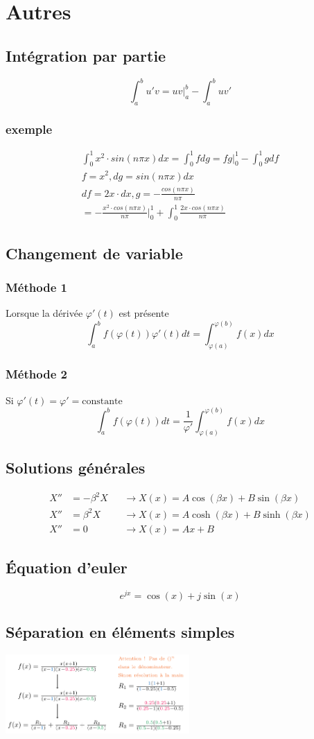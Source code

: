 \documentclass[resume]{subfiles}
\begin{document}
\section{Autres}
\label{sec_autres}
\subsection{Intégration par partie}
$$\int_{a}^{b}u'v=uv\Big|_{a}^{b}-\int_{a}^{b}uv'$$
\subsubsection{exemple}
\begin{align*}
\int_{0}^{1}x^2\cdot sin(n\pi x)dx=\int_{0}^{1} f dg = fg\Big|_{0}^{1} - \int_{0}^{1} g df \\
f=x^2, dg= sin(n\pi x)dx\\
df=2x\cdot dx, g = -\frac{cos(n\pi x)}{n\pi}\\
= -\frac{x^2\cdot cos(n\pi x)}{n\pi}\Big|_{0}^{1}+\int_{0}^{1} \frac{2x\cdot cos(n\pi x)}{n\pi}
\end{align*}

\subsection{Changement de variable}
\subsubsection{Méthode 1}
Lorsque la dérivée $\varphi'(t)$ est présente 
$$\int_{a}^{b}f(\varphi(t))\varphi'(t)dt=\int_{\varphi(a)}^{\varphi(b)}f(x)dx$$
\subsubsection{Méthode 2}
Si $\varphi'(t)=\varphi'=\text{constante}$
$$\int_{a}^{b}f(\varphi(t))dt=\frac{1}{\varphi'}\int_{\varphi(a)}^{\varphi(b)}f(x)dx$$
\subsection{Solutions générales}
\begin{align*}
X''&=-\beta^2 X&&\longrightarrow X(x)=A\cos(\beta x)+B\sin(\beta x)\\
X''&=\beta^2 X&&\longrightarrow X(x)=A\cosh(\beta x)+B\sinh(\beta x)\\
X''&=0 &&\longrightarrow X(x)=Ax+B
\end{align*}

\subsection{Équation d'euler}
$$e^{jx}=\cos(x)+j\sin(x)$$
\subsection{Séparation en éléments simples}
\begin{center}
\includegraphics[width=7cm]{drwg_6.pdf}
\end{center}
\end{document}
